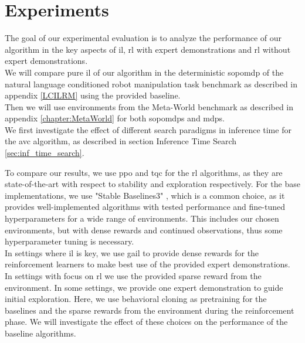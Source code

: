 
\chapter{Experiments}
\label{chapter:Experiments}
The goal of our experimental evaluation is to analyze the performance of our algorithm in the key aspects of 
\ac{il}, \ac{rl} with expert demonstrations and \ac{rl} without expert demonstrations. \\

We will compare pure \ac{il} of our algorithm in the deterministic \ac{sopomdp} of the 
natural language conditioned robot manipulation task benchmark as described in appendix \ref{LCILRM} using the provided baseline.\\

Then we will use environments from the Meta-World benchmark as described in appendix \ref{chapter:MetaWorld} for both \ac{sopomdp}s and \ac{mdp}s.\\

We first investigate the effect of different search paradigms in inference time for the \ac{avc} algorithm, as described in section Inference Time Search \ref{sec:inf_time_search}.

To compare our results, we use \ac{ppo} and \ac{tqc} for the \ac{rl} algorithms, as they are state-of-the-art with respect to stability and 
exploration respectively. For the base implementations, we use "Stable Baselines3" \cite{stable-baselines3}, which is a common choice, as it provides well-implemented algorithms with tested
performance and fine-tuned hyperparameters for a wide range of environments. This includes our chosen environments, but with dense rewards and continued observations,
thus some hyperparameter tuning is necessary.\\

In settings where \ac{il} is key, we use \ac{gail} to provide dense rewards for the reinforcement learners to make best use of the provided expert demonstrations. \\

In settings with focus on \ac{rl} we use the provided sparse reward from the environment. In some settings, we provide one 
expert demonstration to guide initial exploration. Here, we use behavioral cloning as pretraining for the baselines and the sparse rewards from the environment during the reinforcement phase. 
We will investigate the effect of these choices on the performance of the baseline algorithms.\\

